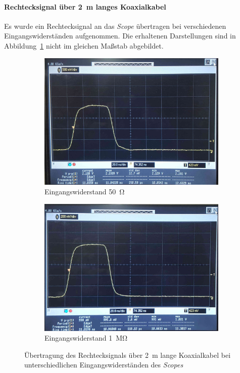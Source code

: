 \documentclass[a4paper,twoside,final]{article}
\begin{document}
\paragraph{Rechtecksignal über \SI{2}{\metre} langes Koaxialkabel}
Es wurde ein Rechtecksignal an das \textit{Scope} übertragen bei verschiedenen Eingangswiderständen aufgenommen. Die erhaltenen Darstellungen sind in Abbildung~\ref{fig:Rechtecksignal_Koaxialkabel} nicht im gleichen Maßstab abgebildet.
\begin{figure}[h]
  \centering
  \begin{subfigure}{0.45\textwidth}
    \includegraphics[width=\textwidth]{Bilder/Bild1.jpg}
    \caption{Eingangswiderstand \SI{50}{\ohm}}
  \end{subfigure}\hspace{1cm}
  \begin{subfigure}{0.45\textwidth}
    \includegraphics[width=\textwidth]{Bilder/Bild2.jpg}
    \caption{Eingangswiderstand \SI{1}{\mega\ohm}}
  \end{subfigure}
  \caption{Übertragung des Rechtecksignals über \SI{2}{\metre} lange Koaxialkabel bei unterschiedlichen Eingangswiderständen des \textit{Scopes}}
  \label{fig:Rechtecksignal_Koaxialkabel}
\end{figure}\\
\end{document}
